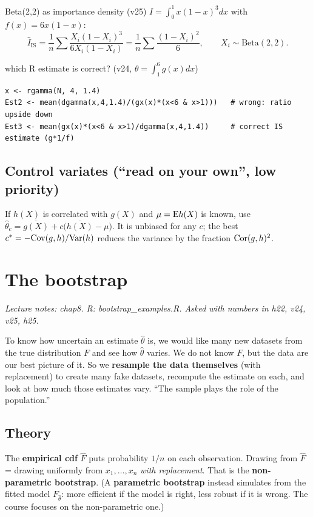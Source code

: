 \begin{example}{Beta(2,2) as importance density (v25)}
$I = \int_0^1x(1-x)^3dx$ with $f(x) = 6x(1-x)$:
\[
\hat I_{\text{IS}} = \frac1n\sum\frac{X_i(1-X_i)^3}{6X_i(1-X_i)} = \frac1n\sum\frac{(1-X_i)^2}{6},\qquad X_i\sim\mathrm{Beta}(2,2).
\]
\end{example}

\begin{example}{which R estimate is correct? (v24, $\theta=\int_1^6 g(x)dx$)}
\begin{Verbatim}
x <- rgamma(N, 4, 1.4)
Est2 <- mean(dgamma(x,4,1.4)/(gx(x)*(x<6 & x>1)))   # wrong: ratio upside down
Est3 <- mean(gx(x)*(x<6 & x>1)/dgamma(x,4,1.4))     # correct IS estimate (g*1/f)
\end{Verbatim}
\end{example}

\subsection{Control variates (``read on your own'', low priority)}
If $h(X)$ is correlated with $g(X)$ and $\mu = \mathrm{E} h(X)$ is known, use
$\hat\theta_c = \overline{g(X)} + c\big(\overline{h(X)}-\mu\big)$. It is unbiased for any $c$; the best $c^* = -\mathrm{Cov}(g,h)/\mathrm{Var}(h)$ reduces the variance by the fraction $\mathrm{Cor}(g,h)^2$.

\section{The bootstrap}
\textit{Lecture notes: chap8. R: bootstrap\_examples.R. Asked with numbers in h22, v24, v25, h25.}

\begin{idea}
To know how uncertain an estimate $\hat\theta$ is, we would like many new datasets from the true distribution $F$ and see how $\hat\theta$ varies. We do not know $F$, but the data are our best picture of it. So we \textbf{resample the data themselves} (with replacement) to create many fake datasets, recompute the estimate on each, and look at how much those estimates vary. ``The sample plays the role of the population.''
\end{idea}

\subsection{Theory}
The \textbf{empirical cdf} $\hat F$ puts probability $1/n$ on each observation. Drawing from $\hat F$ = drawing uniformly from $x_1,\dots,x_n$ \emph{with replacement}. That is the \textbf{non-parametric bootstrap}. (A \textbf{parametric bootstrap} instead simulates from the fitted model $F_{\hat\theta}$: more efficient if the model is right, less robust if it is wrong. The course focuses on the non-parametric one.)

